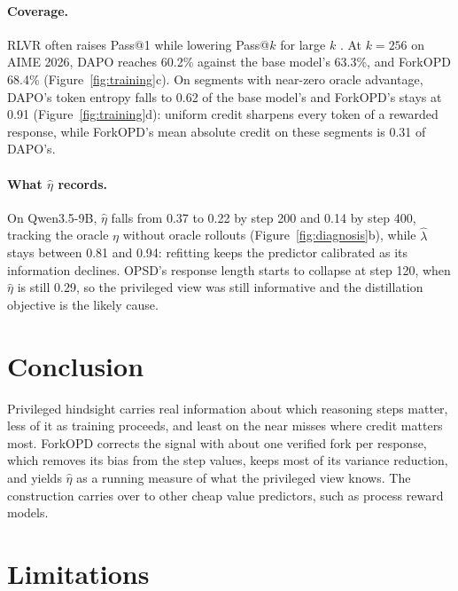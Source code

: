 \documentclass[11pt]{article}
\newcommand{\method}{ForkOPD}
\theoremstyle{remark}
\begin{document}
\paragraph{Coverage.}
RLVR often raises Pass@1 while lowering Pass@$k$ for large $k$ \citep{yue2025does}. At $k=256$ on AIME 2026, DAPO reaches 60.2\% against the base model's 63.3\%, and \method{} 68.4\% (Figure~\ref{fig:training}c). On segments with near-zero oracle advantage, DAPO's token entropy falls to 0.62 of the base model's and \method{}'s stays at 0.91 (Figure~\ref{fig:training}d): uniform credit sharpens every token of a rewarded response, while \method{}'s mean absolute credit on these segments is 0.31 of DAPO's.

\paragraph{What $\hat\eta$ records.}
On Qwen3.5-9B, $\hat\eta$ falls from 0.37 to 0.22 by step 200 and 0.14 by step 400, tracking the oracle $\eta$ without oracle rollouts (Figure~\ref{fig:diagnosis}b), while $\hat\lambda$ stays between 0.81 and 0.94: refitting keeps the predictor calibrated as its information declines. OPSD's response length starts to collapse at step 120, when $\hat\eta$ is still 0.29, so the privileged view was still informative and the distillation objective is the likely cause.

\section{Conclusion}

Privileged hindsight carries real information about which reasoning steps matter, less of it as training proceeds, and least on the near misses where credit matters most. \method{} corrects the signal with about one verified fork per response, which removes its bias from the step values, keeps most of its variance reduction, and yields $\hat\eta$ as a running measure of what the privileged view knows. The construction carries over to other cheap value predictors, such as process reward models.

\section*{Limitations}
\end{document}
